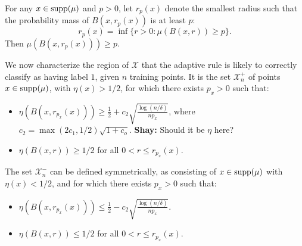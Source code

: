 \documentclass{article}
\def\X{{\mathcal X}}
\def\supp{{\rm supp}}
\newcommand{\shay}[1]{{\color{purple} {\bf Shay:} #1}}
\begin{document}
For any $x \in \supp(\mu)$ and $p > 0$, let $r_p(x)$ denote the smallest radius such that the probability mass of $B(x, r_p(x))$ is at least $p$:
$$ r_p(x) = \inf \{r > 0: \mu(B(x,r)) \geq p \} .$$
Then $\mu(B(x,r_p(x))) \geq p$.

We now characterize the region of $\X$ that the adaptive rule is likely to correctly classify as having label $1$, given $n$ training points. It is the set $\X^+_n$ of points $x \in \supp(\mu)$, with $\eta(x) > 1/2$, for which there exists $p_x > 0$ such that:
\begin{itemize}
\item $\eta(B(x,r_{p_x}(x))) \geq \frac{1}{2} + c_2 \sqrt{\frac{\log (n/\delta)}{np_x}}$, where $c_2 = \max(2c_1, 1/2) \sqrt{1+c_o}$. 
\shay{Should it be $\eta$ here?} 
\item $\eta(B(x,r)) \geq 1/2$ for all $0 < r \leq r_{p_x}(x)$. 
\end{itemize}
The set $\X^-_n$ can be defined symmetrically, as consisting of $x \in \supp(\mu)$ with $\eta(x) < 1/2$, and for which there exists $p_x > 0$ such that:
\begin{itemize}
\item $\eta(B(x,r_{p_x}(x))) \leq \frac{1}{2} - c_2 \sqrt{\frac{\log (n/\delta)}{np_x}}$. 
\item $\eta(B(x,r)) \leq 1/2$ for all $0 < r \leq r_{p_x}(x)$. 
\end{itemize}
\end{document}
